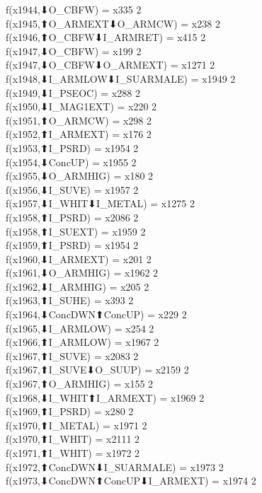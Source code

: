 f(x1944,⬇O_CBFW) = x335 {2} \\
f(x1945,⬆O_ARMEXT⬇O_ARMCW) = x238 {2} \\
f(x1946,⬆O_CBFW⬇I_ARMRET) = x415 {2} \\
f(x1947,⬇O_CBFW) = x199 {2} \\
f(x1947,⬇O_CBFW⬇O_ARMEXT) = x1271 {2} \\
f(x1948,⬇I_ARMLOW⬇I_SUARMALE) = x1949 {2} \\
f(x1949,⬇I_PSEOC) = x288 {2} \\
f(x1950,⬇I_MAG1EXT) = x220 {2} \\
f(x1951,⬆O_ARMCW) = x298 {2} \\
f(x1952,⬆I_ARMEXT) = x176 {2} \\
f(x1953,⬆I_PSRD) = x1954 {2} \\
f(x1954,⬇ConcUP) = x1955 {2} \\
f(x1955,⬇O_ARMHIG) = x180 {2} \\
f(x1956,⬇I_SUVE) = x1957 {2} \\
f(x1957,⬇I_WHIT⬇I_METAL) = x1275 {2} \\
f(x1958,⬆I_PSRD) = x2086 {2} \\
f(x1958,⬆I_SUEXT) = x1959 {2} \\
f(x1959,⬆I_PSRD) = x1954 {2} \\
f(x1960,⬇I_ARMEXT) = x201 {2} \\
f(x1961,⬇O_ARMHIG) = x1962 {2} \\
f(x1962,⬇I_ARMHIG) = x205 {2} \\
f(x1963,⬆I_SUHE) = x393 {2} \\
f(x1964,⬇ConcDWN⬆ConcUP) = x229 {2} \\
f(x1965,⬇I_ARMLOW) = x254 {2} \\
f(x1966,⬆I_ARMLOW) = x1967 {2} \\
f(x1967,⬆I_SUVE) = x2083 {2} \\
f(x1967,⬆I_SUVE⬇O_SUUP) = x2159 {2} \\
f(x1967,⬆O_ARMHIG) = x155 {2} \\
f(x1968,⬇I_WHIT⬆I_ARMEXT) = x1969 {2} \\
f(x1969,⬆I_PSRD) = x280 {2} \\
f(x1970,⬆I_METAL) = x1971 {2} \\
f(x1970,⬆I_WHIT) = x2111 {2} \\
f(x1971,⬆I_WHIT) = x1972 {2} \\
f(x1972,⬆ConcDWN⬇I_SUARMALE) = x1973 {2} \\
f(x1973,⬇ConcDWN⬆ConcUP⬇I_ARMEXT) = x1974 {2} \\

